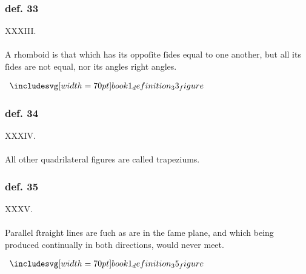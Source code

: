 \pagebreak

\begin{minipage}{0.67\textwidth}
    \subsubsection{def. 33}
    \begin{center}
        XXXIII.\label{book1def33}\\
        \hfill\\
        A rhomboid is that which has its oppoſite ſides equal to one another, but all its ſides are not equal, nor its angles right angles.
    \end{center}
\end{minipage}%
\begin{minipage}{0.33\textwidth}
    \begin{center}
        $\img[0][0][70]{book1_definition_33_figure}$
    \end{center}
\end{minipage}

\hfill

\begin{minipage}{0.67\textwidth}
    \subsubsection{def. 34}
    \begin{center}
        XXXIV.\label{book1def34}\\
        \hfill\\
        All other quadrilateral figures are called trapeziums.\\
    \end{center}
\end{minipage}

\hfill

\begin{minipage}{0.67\textwidth}
    \subsubsection{def. 35}
    \begin{center}
        XXXV.\label{book1def35}\\
        \hfill\\
        Parallel ſtraight lines are ſuch as are in the ſame plane, and which being produced continually in both directions, would never meet.
    \end{center}
\end{minipage}%
\begin{minipage}{0.33\textwidth}
    \begin{center}
        $\img[0][0][70]{book1_definition_35_figure}$
    \end{center}
\end{minipage}

